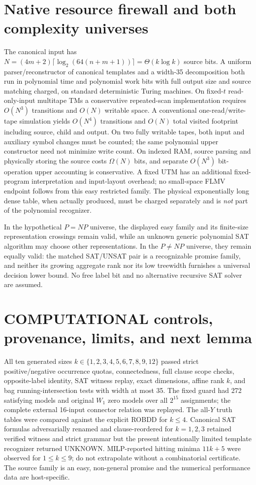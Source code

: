 \documentclass[10pt]{article}
\begin{document}
\section{Native resource firewall and both complexity universes}
\noindent The canonical input has $N=(4m+2)\lceil\log_2(64(n+m+1))\rceil=\Theta(k\log k)$ source bits. A uniform parser/reconstructor of canonical templates and a width-35 decomposition both run in polynomial time and polynomial work bits with full output size and source matching charged, on standard deterministic Turing machines. On fixed-$t$ read-only-input multitape TMs a conservative repeated-scan implementation requires $O(N^3)$ transitions and $O(N)$ writable space. A conventional one-read/write-tape simulation yields $O(N^4)$ transitions and $O(N)$ total visited footprint including source, child and output. On two fully writable tapes, both input and auxiliary symbol changes must be counted; the same polynomial upper constructor need not minimize write count. On indexed RAM, source parsing and physically storing the source costs $\Omega(N)$ bits, and separate $O(N^3)$ bit-operation upper accounting is conservative. A fixed UTM has an additional fixed-program interpretation and input-layout overhead; no small-space FLMV endpoint follows from this easy restricted family. The physical exponentially long dense table, when actually produced, must be charged separately and is \emph{not} part of the polynomial recognizer.

\noindent In the hypothetical $P=NP$ universe, the displayed easy family and its finite-size representation crossings remain valid, while an unknown generic polynomial SAT algorithm may choose other representations. In the $P\ne NP$ universe, they remain equally valid: the matched SAT/UNSAT pair is a recognizable promise family, and neither its growing aggregate rank nor its low treewidth furnishes a universal decision lower bound. No free label bit and no alternative recursive SAT solver are assumed.

\section{COMPUTATIONAL controls, provenance, limits, and next lemma}
\noindent All ten generated sizes $k\in\{1,2,3,4,5,6,7,8,9,12\}$ passed strict positive/negative occurrence quotas, connectedness, full clause scope checks, opposite-label identity, SAT witness replay, exact dimensions, affine rank $k$, and bag running-intersection tests with width at most 35. The fixed guard had 272 satisfying models and original $W_1$ zero models over all $2^{15}$ assignments; the complete external 16-input connector relation was replayed. The all-$Y$ truth tables were compared against the explicit ROBDD for $k\le4$. Canonical SAT formulas adversarially renamed and clause-reordered for $k=1,2,3$ retained verified witness and strict grammar but the present intentionally limited template recognizer returned UNKNOWN. MILP-reported hitting minima $11k+5$ were observed for $1\le k\le9$; do not extrapolate without a combinatorial certificate. The source family is an easy, non-general promise and the numerical performance data are host-specific.
\end{document}
